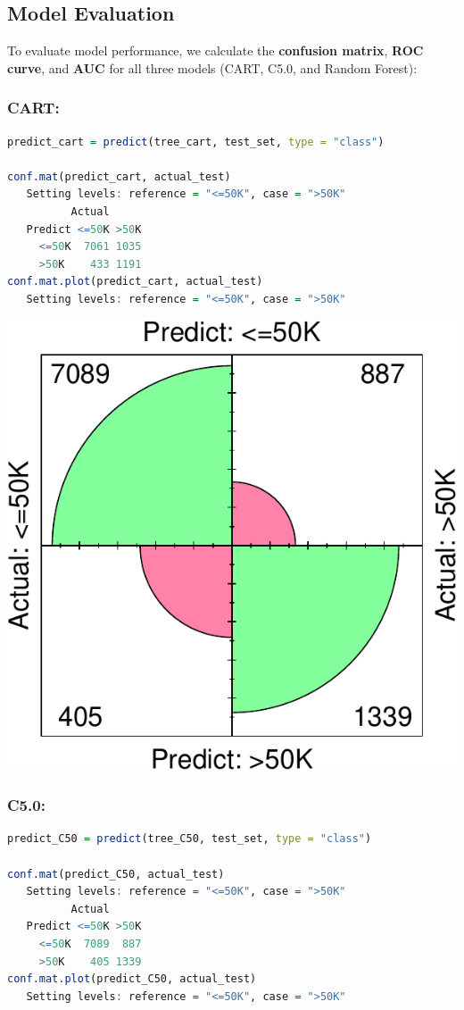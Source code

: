 \documentclass[
]{book}
\theoremstyle{definition}
\theoremstyle{definition}
\theoremstyle{definition}
\theoremstyle{definition}
\theoremstyle{remark}
\begin{document}
\subsection*{Model Evaluation}\label{model-evaluation}

To evaluate model performance, we calculate the \textbf{confusion matrix}, \textbf{ROC curve}, and \textbf{AUC} for all three models (CART, C5.0, and Random Forest):

\subsubsection*{CART:}\label{cart}

\begin{lstlisting}[language=R]
predict_cart = predict(tree_cart, test_set, type = "class")

conf.mat(predict_cart, actual_test)
   Setting levels: reference = "<=50K", case = ">50K"
          Actual
   Predict <=50K >50K
     <=50K  7061 1035
     >50K    433 1191
conf.mat.plot(predict_cart, actual_test)
   Setting levels: reference = "<=50K", case = ">50K"
\end{lstlisting}

\begin{center}\includegraphics[width=0.3\linewidth]{tree_files/figure-latex/unnamed-chunk-11-1} \end{center}

\subsubsection*{C5.0:}\label{c5.0}

\begin{lstlisting}[language=R]
predict_C50 = predict(tree_C50, test_set, type = "class")

conf.mat(predict_C50, actual_test)
   Setting levels: reference = "<=50K", case = ">50K"
          Actual
   Predict <=50K >50K
     <=50K  7089  887
     >50K    405 1339
conf.mat.plot(predict_C50, actual_test)
   Setting levels: reference = "<=50K", case = ">50K"
\end{lstlisting}
\end{document}
